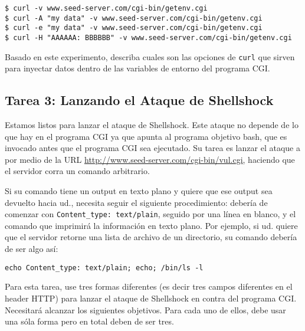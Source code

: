 \begin{lstlisting}
$ curl -v www.seed-server.com/cgi-bin/getenv.cgi
$ curl -A "my data" -v www.seed-server.com/cgi-bin/getenv.cgi
$ curl -e "my data" -v www.seed-server.com/cgi-bin/getenv.cgi
$ curl -H "AAAAAA: BBBBBB" -v www.seed-server.com/cgi-bin/getenv.cgi
\end{lstlisting}
 
Basado en este experimento, describa cuales son las opciones de \texttt{curl} que sirven para inyectar datos dentro de las variables de entorno del programa CGI.


\subsection{Tarea 3: Lanzando el Ataque de Shellshock}

Estamos listos para lanzar el ataque de Shellshock.
Este ataque no depende de lo que hay en el programa CGI ya que apunta al programa objetivo bash, que es invocado antes que el programa CGI sea ejecutado. Su tarea es lanzar el ataque a por medio de la URL \url{http://www.seed-server.com/cgi-bin/vul.cgi}, haciendo que el servidor corra un comando arbitrario.

Si su comando tiene un output en texto plano y quiere que ese output sea devuelto hacia ud., necesita seguir el siguiente procedimiento: debería de comenzar con \texttt{Content\_type: text/plain}, seguido por una línea en blanco, y el comando que imprimirá la información en texto plano. Por ejemplo, si ud. quiere que el servidor retorne una lista de archivo de un directorio, su comando debería de ser algo así:

\begin{lstlisting}
echo Content_type: text/plain; echo; /bin/ls -l
\end{lstlisting}

Para esta tarea, use tres formas diferentes (es decir tres campos diferentes en el header HTTP) para lanzar el ataque de Shellshock en contra del programa CGI. Necesitará alcanzar los siguientes objetivos. Para cada uno de ellos, debe usar una sóla forma pero en total deben de ser tres.

